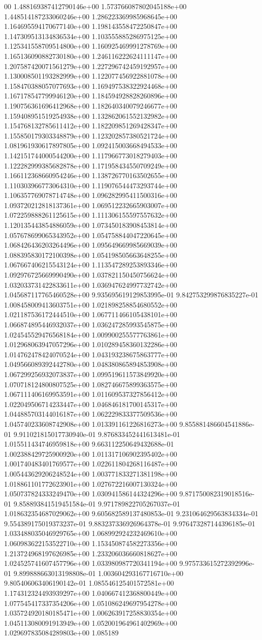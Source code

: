 00	1.488169387412790146e+00	1.573766087802045188e+00	1.448514187233060246e+00	1.286223369985968645e+00	1.164695594170677140e+00	1.198143558472250847e+00	1.147309513134836534e+00	1.103555885286975125e+00	1.125341558709514800e+00	1.160925469991278769e+00	1.165136090882730180e+00	1.246116222624111147e+00	1.207587420071561279e+00	1.227296742459192957e+00	1.130008501193282999e+00	1.122077456922881078e+00	1.158470388057077693e+00	1.169497538322924468e+00	1.167178547799946120e+00	1.184594928828260896e+00	1.190756361696412968e+00	1.182640340079246677e+00	1.159408951519254938e+00	1.132862061552132982e+00	1.154768132785611412e+00	1.182209851269428347e+00	1.155850179303348879e+00	1.123202857380521724e+00	1.081961930617897805e+00	1.092415003668494533e+00	1.142151744000544200e+00	1.117966773018279403e+00	1.122282999385682878e+00	1.171958434550709249e+00	1.166112368660954246e+00	1.138726770163502655e+00	1.110303966773064310e+00	1.119076544473293744e+00	1.106357769078714748e+00	1.096282995411500316e+00	1.093720212818137361e+00	1.069512232665903007e+00	1.072259888261125615e+00	1.111306155597557632e+00	1.120135443854886059e+00	1.073450183908453814e+00	1.057678699065343952e+00	1.054758844047220645e+00	1.068426436203264496e+00	1.095649669985669039e+00	1.088395830172100398e+00	1.054198505663648255e+00	1.067667406215543124e+00	1.113547289253893346e+00	1.092976725669990490e+00	1.037821150450756624e+00	1.032033731422833611e+00	1.036947624997732742e+00	1.045687117765460528e+00	9.935695619129853995e-01	9.842753299876835227e-01	1.008458009413603751e+00	1.021898258854680552e+00	1.021187536172444510e+00	1.067711466105438101e+00	1.066874895446932037e+00	1.036247285993545875e+00	1.024545529476568184e+00	1.009900255577763861e+00	1.012968063947057296e+00	1.010289458360132286e+00	1.014762478424070524e+00	1.043193238675863777e+00	1.049566089392442780e+00	1.048380865894853908e+00	1.067299256932073837e+00	1.099519611573849920e+00	1.070718124800807525e+00	1.082746675899363575e+00	1.067111406169953591e+00	1.011609537327856412e+00	1.022049506714233447e+00	1.046846181700145317e+00	1.044885703144016187e+00	1.062229833377509536e+00	1.045740233608742908e+00	1.013391161226816273e+00	9.855881486604541886e-01	9.911021815017730940e-01	9.876833452441613481e-01	1.015511434746959818e+00	9.663112250649432688e-01	1.002388429725900920e+00	1.011317106902395402e+00	1.001740483401769577e+00	1.022611804268116487e+00	1.005443629206248524e+00	1.003771833271381198e+00	1.018861101772623901e+00	1.027672216007130324e+00	1.050737824333249470e+00	1.030941586144324296e+00	9.871750082319018516e-01	9.858893841519451584e-01	9.971789822705267037e-01	1.018632354687029062e+00	9.605682589137480853e-01	9.231064629563834334e-01	9.554389175019373237e-01	9.883237336926964378e-01	9.976473287144396185e-01	1.033488035046929765e+00	1.068992924232469610e+00	1.060983622153522710e+00	1.153450874582273356e+00	1.213724968197626985e+00	1.233206036660818627e+00	1.024525741607457796e+00	1.033980987720341194e+00	9.975733615272392996e-01	9.899888663013198808e-01	1.003604293167716710e+00	9.805406063406190142e-01	1.085546125401572581e+00	1.174312324493939297e+00	1.040667412368800449e+00	1.077545417337354206e+00	1.051086249697954278e+00	1.035724920180185471e+00	1.006263917258830354e+00	1.045113080091913949e+00	1.052001964961402969e+00	1.029697835084289803e+00	1.085189